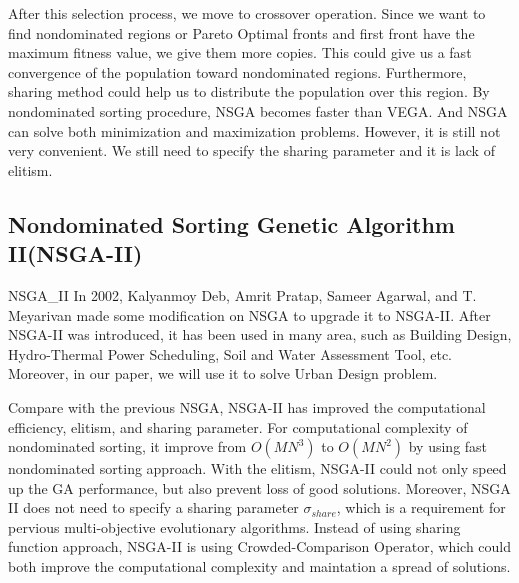 After this selection process, we move to crossover operation. Since we want to find nondominated regions or Pareto Optimal fronts and first front have the maximum fitness value, we give them more copies. This could give us a fast convergence of the population toward nondominated regions. Furthermore, sharing method could help us to distribute the population over this region. By nondominated sorting procedure, NSGA becomes faster than VEGA. And NSGA can solve both minimization and maximization problems. However, it is still not very convenient. We still need to specify the sharing parameter and it is lack of elitism.

\subsection{Nondominated Sorting Genetic Algorithm II(NSGA-II)}NSGA_II
In 2002, Kalyanmoy Deb, Amrit Pratap, Sameer Agarwal, and T. Meyarivan made some modification on NSGA to upgrade it to NSGA-II\cite{NSGA_II}. After NSGA-II was introduced, it has been used in many area, such as Building Design\cite{Magnier_2010_Multiobjective}, Hydro-Thermal Power Scheduling\cite{Deb_2007_Dynamic}, Soil and Water Assessment Tool\cite{Bekele_2007_Multi}, etc. Moreover, in our paper, we will use it to solve Urban Design problem. 

Compare with the previous NSGA, NSGA-II has improved the computational efficiency, elitism, and sharing parameter\cite{NSGA_II}. For computational complexity of nondominated sorting, it improve from \(O(MN^{3})\) to \(O(MN^{2})\) by using fast nondominated sorting approach\cite{NSGA_II}. With the elitism, NSGA-II could not only speed up the GA performance, but also prevent loss of good solutions. Moreover, NSGA II does not need to specify a sharing parameter \(\sigma_{share}\), which is a requirement for pervious multi-objective evolutionary algorithms. Instead of using sharing function approach, NSGA-II is using Crowded-Comparison Operator, which could both improve the computational complexity and maintation a spread of solutions.


